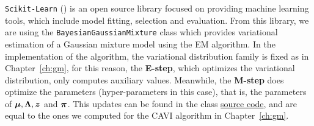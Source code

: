 
\texttt{Scikit-Learn} (\cite{scikit-learn}) is an open source library focused on providing machine learning tools, which include model fitting, selection and evaluation. From this library, we are using the \texttt{BayesianGaussianMixture} class which provides variational estimation of a Gaussian mixture model using the EM algorithm.
In the implementation of the algorithm, the variational distribution family is fixed as in Chapter~\ref{ch:gm}, for this reason, the \textbf{E-step}, which optimizes the variational distribution, only computes auxiliary values. Meanwhile, the \textbf{M-step} does optimize the parameters (hyper-parameters in this case), that is, the parameters of \(\bm{\mu}, \bm{\Lambda}, \bm{z}\) and \(\bm{\pi}\). This updates can be found in the class \href{https://github.com/scikit-learn/scikit-learn/blob/0fb307bf3/sklearn/mixture/_bayesian_mixture.py#L65}{source code}, and are equal to the ones we computed for the CAVI algorithm in Chapter~\ref{ch:gm}.

